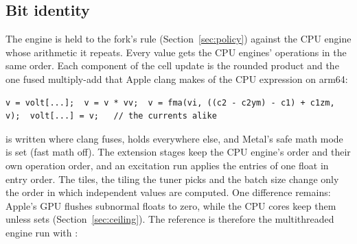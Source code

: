\subsection{Bit identity}
The engine is held to the fork's rule (Section~\ref{sec:policy}) against the CPU engine whose arithmetic it repeats.
Every value gets the CPU engines' operations in the same order. Each component of the cell update is the rounded
product and the one fused multiply-add that Apple clang makes of the CPU expression on arm64:
\begin{lstlisting}
v = volt[...];  v = v * vv;  v = fma(vi, ((c2 - c2ym) - c1) + c1zm, v);  volt[...] = v;   // the currents alike
\end{lstlisting}
 is written where clang fuses,  holds everywhere else, and Metal's
safe math mode is set (fast math off). The extension stages keep the CPU engine's order and their own operation order,
and an excitation run applies the entries of one float in entry order. The tiles, the tiling the tuner picks and the
batch size change only the order in which independent values are computed. One difference remains: Apple's GPU
flushes subnormal floats to zero, while the CPU cores keep them unless  sets 
(Section~\ref{sec:ceiling}). The reference is therefore the multithreaded engine run with :
